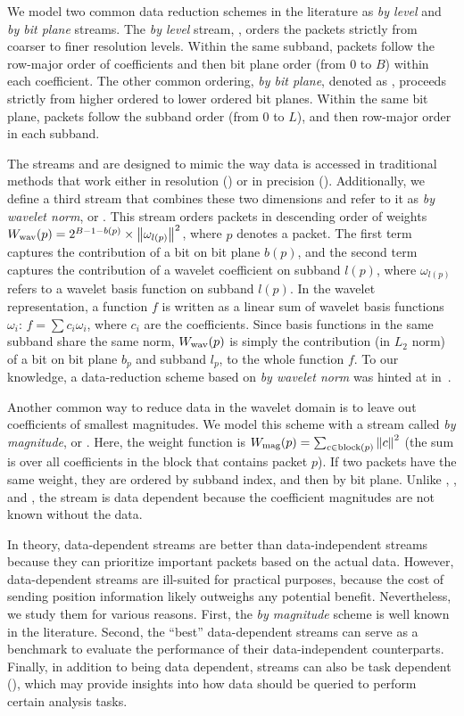 We model two common data reduction schemes in the literature as \emph{by level} and \emph{by bit
plane} streams. The \emph{by level} stream, \slvl, orders the packets strictly from coarser to finer
resolution levels. Within the same subband, packets follow the row-major order of coefficients and
then bit plane order (from 0 to $B$) within each coefficient. The other common ordering, \emph{by
bit plane}, denoted as \sbit, proceeds strictly from higher ordered to lower ordered bit planes.
Within the same bit plane, packets follow the subband order (from 0 to $L$), and then row-major
order in each subband.

The streams \slvl and \sbit are designed to mimic the way data is accessed in traditional methods
that work either in resolution (\slvl) or in precision (\sbit). Additionally, we define a third
stream that combines these two dimensions and refer to it as \emph{by wavelet norm}, or \swav. This
stream orders packets in descending order of weights $\wwav(p)=2^{B-1-b(p)}\times
\norm{\omega_{l(p)}}^2$, where $p$ denotes a packet. The first term captures the contribution of a
bit on bit plane $b(p)$, and the second term captures the contribution of a wavelet coefficient on
subband $l(p)$, where $\omega_{l(p)}$ refers to a wavelet basis function on subband $l(p)$. In the
wavelet representation, a function $f$ is written as a linear sum of wavelet basis functions
$\omega_i$: $f=\sum{c_i\omega_i}$, where $c_i$ are the coefficients. Since basis functions in the
same subband share the same norm, $\wwav(p)$ is simply the contribution (in $L_2$ norm) of a bit on
bit plane $b_p$ and subband $l_p$, to the whole function $f$. To our knowledge, a data-reduction
scheme based on \emph{by wavelet norm} was hinted at in~\cite{weiss}.

Another common way to reduce data in the wavelet domain is to leave out coefficients of smallest
magnitudes. We model this scheme with a stream called \emph{by magnitude}, or \smag. Here, the
weight function is $\wmag(p)=\sum_{c\in \text{block}(p)}\norm{c}^2$ (the sum is over all
coefficients in the block that contains packet $p$). If two packets have the same weight, they are
ordered by subband index, and then by bit plane. Unlike \slvl, \sbit, and \swav, the \smag stream is
data dependent because the coefficient magnitudes are not known without the data.

In theory, data-dependent streams are better than data-independent streams because they can
prioritize important packets based on the actual data. However, data-dependent streams are
ill-suited for practical purposes, because the cost of sending position information likely outweighs
any potential benefit. Nevertheless, we study them for various reasons. First, the \emph{by
magnitude} scheme is well known in the literature. Second, the ``best'' data-dependent streams can
serve as a benchmark to evaluate the performance of their data-independent counterparts. Finally, in
addition to being data dependent, streams can also be task dependent (),
which may provide insights into how data should be queried to perform certain analysis tasks.

